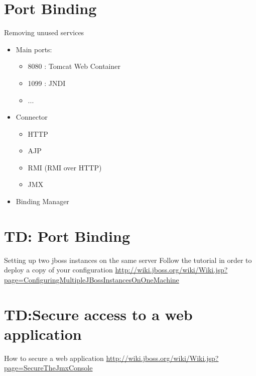 \documentclass[handout]{beamer}
\begin{document}
\section{Port Binding}
	\begin{frame}
		\begin{block}{Removing unused services}
			\begin{itemize}
 				\item Main ports:
				\begin{itemize}
 					\item 8080 : Tomcat Web Container
					\item 1099 : JNDI
					\item ...
				\end{itemize}
				\item Connector
				\begin{itemize}
					\item HTTP
					\item AJP
				 	\item RMI (RMI over HTTP)
					\item JMX	 
				\end{itemize}
				\item Binding Manager
			\end{itemize}
		\end{block}
	\end{frame}
\section{TD: Port Binding}
	\begin{frame}
		\begin{block}{Setting up two jboss instances on the same server}
			Follow the tutorial in order to deploy a copy of your configuration
			\url{http://wiki.jboss.org/wiki/Wiki.jsp?page=ConfiguringMultipleJBossInstancesOnOneMachine}
		\end{block}
	\end{frame}


\section{TD:Secure access to a web application}
	\begin{frame}
		\begin{block}{How to secure a web application}
		 	\url{http://wiki.jboss.org/wiki/Wiki.jsp?page=SecureTheJmxConsole}
		\end{block}
	\end{frame}
\end{document}
